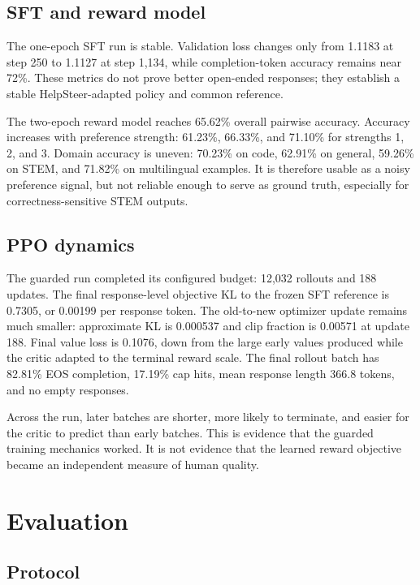\documentclass[10pt,twocolumn]{article}
\begin{document}
\subsection{SFT and reward model}

The one-epoch SFT run is stable. Validation loss changes only from 1.1183 at
step 250 to 1.1127 at step 1,134, while completion-token accuracy remains near
72\%. These metrics do not prove better open-ended responses; they establish a
stable HelpSteer-adapted policy and common reference.

The two-epoch reward model reaches 65.62\% overall pairwise accuracy. Accuracy
increases with preference strength: 61.23\%, 66.33\%, and 71.10\% for strengths
1, 2, and 3. Domain accuracy is uneven: 70.23\% on code, 62.91\% on general,
59.26\% on STEM, and 71.82\% on multilingual examples. It is therefore usable
as a noisy preference signal, but not reliable enough to serve as ground truth,
especially for correctness-sensitive STEM outputs.

\subsection{PPO dynamics}

The guarded run completed its configured budget: 12,032 rollouts and 188
updates. The final response-level objective KL to the frozen SFT reference is
0.7305, or 0.00199 per response token. The old-to-new optimizer update remains
much smaller: approximate KL is 0.000537 and clip fraction is 0.00571 at update
188. Final value loss is 0.1076, down from the large early values produced while
the critic adapted to the terminal reward scale. The final rollout batch has
82.81\% EOS completion, 17.19\% cap hits, mean response length 366.8 tokens,
and no empty responses.

Across the run, later batches are shorter, more likely to terminate, and easier
for the critic to predict than early batches. This is evidence that the guarded
training mechanics worked. It is not evidence that the learned reward objective
became an independent measure of human quality.

\section{Evaluation}

\subsection{Protocol}
\end{document}
